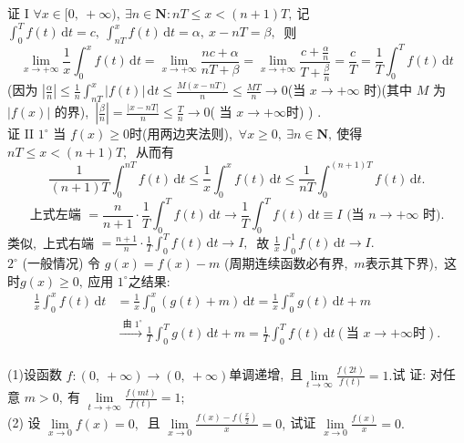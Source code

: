 \begin{solution}
	证 I $ \forall x \in$$[0,\ +\infty),\  \exists n \in \mathbf{N}: n T \leqslant x<(n+1) T ,\ $记 $ \int_{0}^{T} f(t)\,\mathrm{d} t=c,\  \int_{n T}^{x} f(t) \,\mathrm{d} t=\alpha ,\ x-n T=\beta ,\ $ 则
	$$\lim\limits_{x \rightarrow+\infty} \frac{1}{x} \int_{0}^{x} f(t) \,\mathrm{d} t=\lim\limits_{x \rightarrow+\infty} \frac{n c+\alpha}{n T+\beta}=\lim\limits_{x \rightarrow+\infty} \frac{c+\frac{\alpha}{n}}{T+\frac{\beta}{n}}=\frac{c}{T}=\frac{1}{T} \int_{0}^{T} f(t)\, \mathrm{d} t$$
	(因为 $ \left|\frac{\alpha}{n}\right| \leqslant \frac{1}{n} \int_{n T}^{x}|f(t)|\, \mathrm{d} t \leqslant \frac{M(x-n T)}{n} \leqslant \frac{M T}{n} \rightarrow 0  $(当 $ x \rightarrow+\infty $ 时)(其中 $ M $ 为 $ |f(x)|$  的界),\  $\left|\frac{\beta}{n}\right|=\frac{|x-n T|}{n} \leqslant \frac{T}{n} \rightarrow 0$(  当 $ x \rightarrow+\infty  $时)  ) .\\
	证 II  $1^{\circ} $ 当 $ f(x) \geqslant 0  $时(用两边夹法则),\  $ \forall x \geqslant 0,\  \exists n \in \mathbf{N} ,\  $使得 $ n T \leqslant x< (n+1) T ,\ $ 从而有
	$$\frac{1}{(n+1) T} \int_{0}^{n T} f(t) \,\mathrm{d} t \leqslant \frac{1}{x} \int_{0}^{x} f(t)\, \mathrm{d} t \leqslant \frac{1}{n T} \int_{0}^{(n+1) T} f(t)\, \mathrm{d} t . $$
	$$\text { 上式左端 }=\frac{n}{n+1} \cdot \frac{1}{T} \int_{0}^{T} f(t) \,\mathrm{d} t \rightarrow \frac{1}{T} \int_{0}^{T} f(t)\, \mathrm{d} t \equiv I \text { (当 } n \rightarrow+\infty \text { 时). }$$
	类似,\ 上式右端  $=\frac{n+1}{n} \cdot \frac{1}{T} \int_{0}^{T} f(t)\, \mathrm{d} t \rightarrow I ,\ $ 故  $\frac{1}{x} \int_{0}^{1} f(t) \,\mathrm{d} t \rightarrow I .$\\
	$2^{\circ} $ (一般情况) 令 $ g(x)=f(x)-m $ (周期连续函数必有界,\ $ m $表示其下界),\ 这时$  g(x) \geqslant 0 ,\ $应用  $1^{\circ}  $之结果:
	$$\begin{aligned}
		\frac{1}{x} \int_{0}^{x} f(t) \,\mathrm{d} t&=\frac{1}{x} \int_{0}^{x}(g(t)+m) \,\mathrm{d} t=\frac{1}{x} \int_{0}^{x} g(t)\, \mathrm{d} t+m \\
		&\stackrel{\text { 由 } {1^\circ}}{\longrightarrow} \frac{1}{T} \int_{0}^{T} g(t)\, \mathrm{d} t+m=\frac{1}{T} \int_{0}^{T} f(t) \,\mathrm{d} t (\text {当 }x\rightarrow+\infty\text{时}). \\
	\end{aligned}$$
\end{solution}
\newpage
\begin{problem}
	(1)设函数 $ f:(0,\ +\infty) \rightarrow(0,\ +\infty)  $单调递增,\  且$  \lim\limits_{t \rightarrow \infty} \frac{f(2 t)}{f(t)}=1 . $试 证: 对任意 $ m>0 ,\  $有  $\lim\limits_{t\rightarrow+\infty} \frac{f(m t)}{f(t)}=1 ;$\\
	(2) 设  $\lim\limits_{x\rightarrow 0} f(x)=0 ,\ $ 且 $ \lim\limits_{x \rightarrow 0} \frac{f(x)-f\left(\frac{x}{2}\right)}{x}=0 ,\  $试证  $\lim\limits_{x \rightarrow 0} \frac{f(x)}{x}=0 . $
\end{problem}
